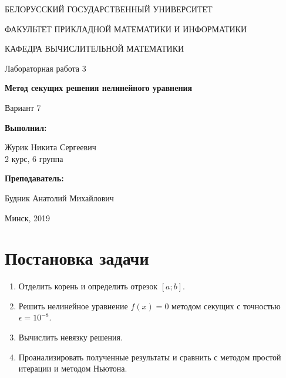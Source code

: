 \documentclass[14pt, a4paper]{article}
\begin{document}
\begin{titlepage}
\begin{center}
\large{БЕЛОРУССКИЙ ГОСУДАРСТВЕННЫЙ УНИВЕРСИТЕТ 

ФАКУЛЬТЕТ ПРИКЛАДНОЙ МАТЕМАТИКИ И ИНФОРМАТИКИ

КАФЕДРА ВЫЧИСЛИТЕЛЬНОЙ МАТЕМАТИКИ}
\end{center}
\vspace*{\fill}
\begin{center}
Лабораторная работа 3

\large{\textbf{Метод секущих решения нелинейного уравнения}}

Вариант 7
\end{center}
\begin{flushright}
\textbf{Выполнил:}

Журик Никита Сергеевич \\ 2 курс, 6 группа

\textbf{Преподаватель:}

Будник Анатолий Михайлович
\end{flushright}
\vspace*{\fill}
\begin{center}
Минск, 2019
\end{center}
\end{titlepage}

\tableofcontents
\newpage

\newpage
{}

  \section{Постановка задачи}
    \begin{enumerate}
      \item
      Отделить корень и определить отрезок $[a; b]$.
      \item
      Решить нелинейное уравнение $f(x) = 0$ методом секущих с точностью $\epsilon = 10^{-8}$.
      \item
      Вычислить невязку решения.
      \item
      Проанализировать полученные результаты и сравнить с методом простой итерации и методом Ньютона.
    \end{enumerate}
\end{document}
